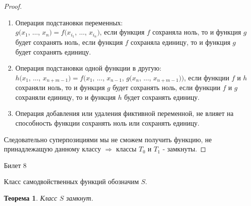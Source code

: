 \documentclass[a4paper, 12pt]{article}
\theoremstyle{definition}
\theoremstyle{plain}
\newtheorem*{theorem}{Теорема}
\theoremstyle{remark}
\begin{document}
  \begin{proof}
    \begin{enumerate}
      \item Операция подстановки переменных:\\
      $g(x_1$, $\ldots$, $x_n)=f(x_{i_1}$, $\ldots$, $x_{i_n})$, если функция $f$ сохраняла ноль, то и функция $g$ будет сохранять ноль, если функция $f$ сохраняла единицу, то и функция $g$ будет сохранять единицу.
      \item Операция подстановки одной функции в другую:\\
      $h(x_1$, $\ldots$, $x_{n+m-1})=f(x_1$, $\ldots$, $x_{n-1}$, $g(x_n$, $\ldots$, $x_{n+m-1}))$, если функции $f$ и $h$ сохраняли ноль, то и функция $g$ будет сохранять ноль, если функции $f$ и $g$ сохраняли единицу, то и функция $h$ будет сохранять единицу.
      \item Операция добавления или удаления фиктивной переменной, не влияет на способность функции сохранять ноль или сохранять единицу.
    \end{enumerate}
    Следовательно суперпозициями мы не сможем получить функцию, не принадлежащую данному классу $\Longrightarrow$ классы $T_0$ и $T_1$ - замкнуты. 
  \end{proof}
  \begin{center}
    Билет 8
  \end{center}
  Класс самодвойственных функций обозначим $S$.
  \begin{theorem}
    Класс $S$ замкнут.
  \end{theorem}
\end{document}
